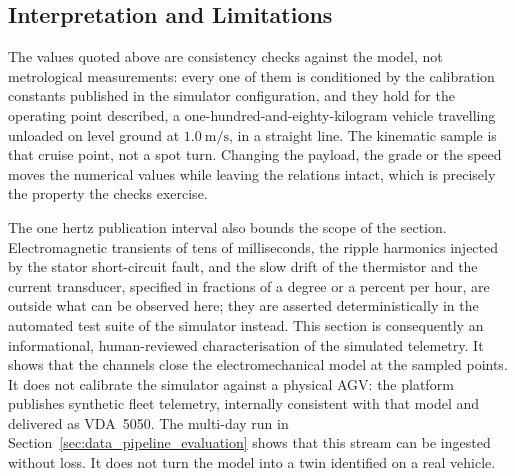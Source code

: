 \subsection{Interpretation and Limitations}

The values quoted above are consistency checks against the model, not metrological
measurements: every one of them is conditioned by the calibration constants published in
the simulator configuration, and they hold for the operating point described, a
one-hundred-and-eighty-kilogram vehicle travelling unloaded on level ground at
$1.0~\mathrm{m/s}$, in a straight line. The kinematic sample is that cruise point,
not a spot turn. Changing the payload, the grade or the speed moves the numerical
values while leaving the relations intact, which is precisely the property the checks
exercise.

The one hertz publication interval also bounds the scope of the section. Electromagnetic
transients of tens of milliseconds, the ripple harmonics injected by the stator
short-circuit fault, and the slow drift of the thermistor and the current transducer,
specified in fractions of a degree or a percent per hour, are outside what can be
observed here; they are asserted deterministically in the automated test suite of the
simulator instead. This section is consequently an informational, human-reviewed
characterisation of the simulated telemetry. It shows that the channels close the
electromechanical model at the sampled points. It does not calibrate the simulator
against a physical AGV: the platform publishes synthetic fleet telemetry, internally
consistent with that model and delivered as VDA~5050. The multi-day run in
Section~\ref{sec:data_pipeline_evaluation} shows that this stream can be ingested
without loss. It does not turn the model into a twin identified on a real vehicle.

